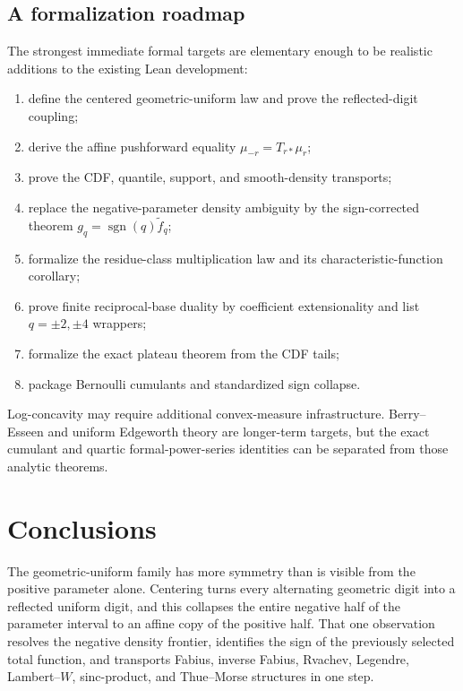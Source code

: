 \documentclass[11pt]{article}
\theoremstyle{definition}
\newcommand{\sgn}{\operatorname{sgn}}
\begin{document}
\subsection{A formalization roadmap}

The strongest immediate formal targets are elementary enough to be realistic additions
to the existing Lean development:

\begin{enumerate}[leftmargin=2.2em]
\item define the centered geometric-uniform law and prove the reflected-digit coupling;
\item derive the affine pushforward equality
      \(\mu_{-r}=T_{r*}\mu_r\);
\item prove the CDF, quantile, support, and smooth-density transports;
\item replace the negative-parameter density ambiguity by the sign-corrected theorem
      \(g_q=\sgn(q)\widetilde f_q\);
\item formalize the residue-class multiplication law and its characteristic-function
      corollary;
\item prove finite reciprocal-base duality by coefficient extensionality and list
      \(q=\pm2,\pm4\) wrappers;
\item formalize the exact plateau theorem from the CDF tails;
\item package Bernoulli cumulants and standardized sign collapse.
\end{enumerate}

Log-concavity may require additional convex-measure infrastructure.  Berry--Esseen and
uniform Edgeworth theory are longer-term targets, but the exact cumulant and quartic
formal-power-series identities can be separated from those analytic theorems.

\section{Conclusions}

The geometric-uniform family has more symmetry than is visible from the positive
parameter alone.  Centering turns every alternating geometric digit into a reflected
uniform digit, and this collapses the entire negative half of the parameter interval to
an affine copy of the positive half.  That one observation resolves the negative density
frontier, identifies the sign of the previously selected total function, and transports
Fabius, inverse Fabius, Rvachev, Legendre, Lambert--\(W\), sinc-product, and Thue--Morse
structures in one step.
\end{document}
